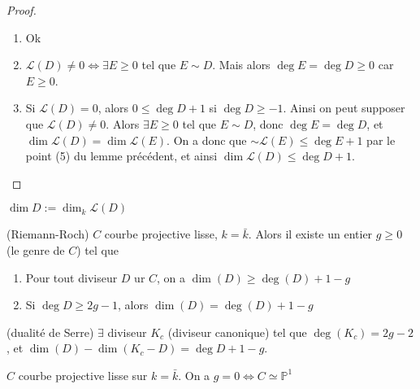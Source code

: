         \begin{proof}
            \begin{enumerate}
                \item Ok
                \item $\mathcal{L}(D) \neq 0 \iff \exists E \geq 0$ tel que $E \sim D$. Mais alors $\deg E = \deg D \geq 0$ car $E \geq 0$.
                \item Si $\mathcal{L}(D) = 0$, alors $0 \leq \deg D + 1$ si $\deg D \geq -1$. Ainsi on peut supposer que $\mathcal{L}(D) \neq 0$. Alors $\exists E \geq 0$ tel que $E \sim D$, donc $\deg E = \deg D$, et $\dim \mathcal{L}(D) = \dim \mathcal{L}(E)$. On a donc que $\sim \mathcal{L}(E) \leq \deg E + 1$ par le point (5) du lemme précédent, et ainsi $\dim \mathcal{L}(D) \leq \deg D + 1$.
            \end{enumerate}
        \end{proof}
        \begin{nota}
            $\dim D := \dim_k \mathcal{L}(D)$
        \end{nota}
        \begin{theo} (Riemann-Roch)
            \label{RR}
            $C$ courbe projective lisse, $k = \bar k$. Alors il existe un entier $g \geq 0$ (le genre de $C$) tel que 
            \begin{enumerate}
                \item Pour tout diviseur $D$ ur $C$, on a $\dim(D) \geq \deg(D) + 1 - g$
                \item Si $\deg D \geq 2g - 1$, alors $\dim(D) = \deg(D) + 1 - g$
            \end{enumerate}
        \end{theo}
        \begin{theo} (dualité de Serre)
            $\exists$ diviseur $K_c$ (diviseur canonique) tel que $\deg(K_c) = 2g - 2$, et $\dim(D) - \dim(K_c - D) = \deg D + 1 - g$.
        \end{theo}
        \begin{theo}
            $C$ courbe projective lisse sur $k = \bar k$. On a $g = 0 \iff C \simeq \mathbb{P}^1$
        \end{theo}
